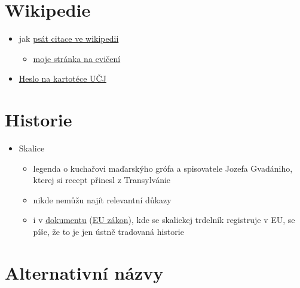 \section{Wikipedie}\label{Wikipedie}

\begin{itemize}
\tightlist
\item
  jak
  \href{https://cs.wikipedia.org/wiki/N\%C3\%A1pov\%C4\%9Bda:Reference_ve_wikik\%C3\%B3du}{psát
  citace ve wikipedii}

  \begin{itemize}
  \tightlist
  \item
    \href{https://cs.wikipedia.org/wiki/Wikipedista:Michal_h21/P\%C3\%ADskovi\%C5\%A1t\%C4\%9B}{moje
    stránka na cvičení}
  \end{itemize}
\item
  \href{https://bara.ujc.cas.cz/psjc/search.php?hledej=Hledej&heslo=trdeln\%C3\%ADk&where=hesla&zobraz_ps=ps&zobraz_cards=cards&pocet_karet=100&ps_heslo=trdlovec&ps_startfrom=0&ps_numcards=7&numcchange=no&not_initial=1}{Heslo
  na kartotéce UČJ}
\end{itemize}

\section{Historie}\label{Historie}

\begin{itemize}
\tightlist
\item
  Skalice

  \begin{itemize}
  \tightlist
  \item
    legenda o kuchařovi maďarskýho grófa a spisovatele Jozefa Gvadániho,
    kterej si recept přinesl z Transylvánie
  \item
    nikde nemůžu najít relevantní důkazy
  \item
    i v \href{https://www.tmdn.org/giview/gi/EUGI00000013744}{dokumentu}
    (\href{https://eur-lex.europa.eu/legal-content/EN/ALL/?uri=CELEX\%3A52007XC0421\%2802\%29}{EU
    zákon}), kde se skalickej trdelník registruje v EU, se píše, že to
    je jen ústně tradovaná historie
  \end{itemize}
\end{itemize}

\section{Alternativní názvy}\label{Alternativnuxedux20nuxe1zvy}

